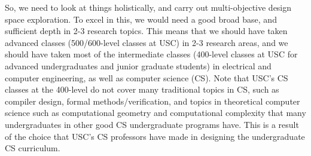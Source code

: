 \begin{enumerate}
So, we need to look at things holistically, and carry out multi-objective design space exploration. To excel in this, we would need a good broad base, and sufficient depth in 2-3 research topics. This means that we should have taken advanced classes (500/600-level classes at USC) in 2-3 research areas, and we should have taken most of the intermediate classes (400-level classes at USC for advanced undergraduates and junior graduate students) in electrical and computer engineering, as well as computer science (CS). Note that USC's CS classes at the 400-level do not cover many traditional topics in CS, such as compiler design, formal methods/verification, and topics in theoretical computer science such as computational geometry and computational complexity that many undergraduates in other good CS undergraduate programs have. This is a result of the choice that USC's CS professors have made in designing the undergraduate CS curriculum.


\end{enumerate}
